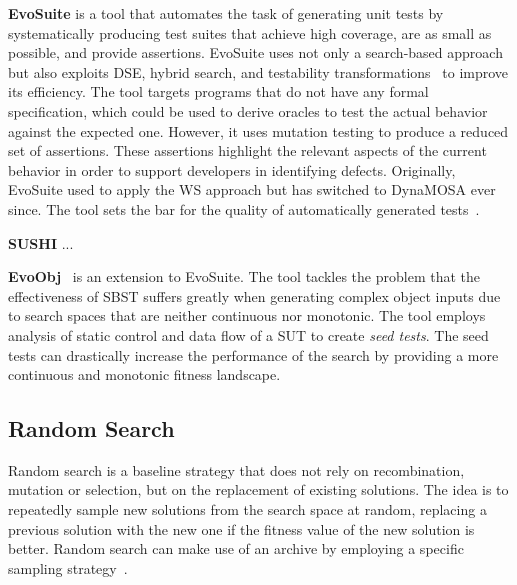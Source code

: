 \documentclass{article}
\begin{document}
\textbf{EvoSuite} is a tool that automates the task of generating unit tests by systematically producing test suites that achieve high coverage, are as small as possible, and provide assertions. EvoSuite uses not only a search-based approach but also exploits \ac{DSE}, hybrid search, and testability transformations~\cite{Harman2004} to improve its efficiency. The tool targets programs that do not have any formal specification, which could be used to derive oracles to test the actual behavior against the expected one. However, it uses mutation testing to produce a reduced set of assertions. These assertions highlight the relevant aspects of the current behavior in order to support developers in identifying defects. Originally, EvoSuite used to apply the \ac{WS} approach but has switched to \ac{DynaMOSA} ever since. The tool sets the bar for the quality of automatically generated tests~\cite{Vogl2021,Panichella2020,Campos2019,Fraser2018,Fraser2016,Fraser2017}.

\textbf{SUSHI} ...

\textbf{EvoObj}~\cite{Lin2021} is an extension to EvoSuite. The tool tackles the problem that the effectiveness of \ac{SBST} suffers greatly when generating complex object inputs due to search spaces that are neither continuous nor monotonic. The tool employs analysis of static control and data flow of a \ac{SUT} to create \textit{seed tests}. The seed tests can drastically increase the performance of the search by providing a more continuous and monotonic fitness landscape. 

\subsection{Random Search}

Random search is a baseline strategy that does not rely on recombination, mutation or selection, but on the replacement of existing solutions. The idea is to repeatedly sample new solutions from the search space at random, replacing a previous solution with the new one if the fitness value of the new solution is better. Random search can make use of an archive by employing a specific sampling strategy~\cite{Campos2017}.
\end{document}
